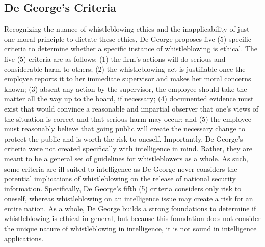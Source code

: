 \documentclass [12 pt] {article}
\begin{document}
\subsection{De George's Criteria}
Recognizing the nuance of whistleblowing ethics and the inapplicability of just one moral principle to dictate these ethics, De George proposes five (5) specific criteria to determine whether a specific instance of whistleblowing is ethical. The five (5) criteria are as follows: (1) the firm's actions will do serious and considerable harm to others; (2) the whistleblowing act is justifiable once the employee reports it to her immediate supervisor and makes her moral concerns known; (3) absent any action by the supervisor, the employee should take the matter all the way up to the board, if necessary; (4) documented evidence must exist that would convince a reasonable and impartial observer that one's views of the situation is correct and that serious harm may occur; and (5) the employee must reasonably believe that going public will create the necessary change to protect the public and is worth the risk to oneself.
\bigbreak
Importantly, De George's criteria were not created specifically with intelligence in mind. Rather, they are meant to be a general set of guidelines for whistleblowers as a whole. As such, some criteria are ill-suited to intelligence as De George never considers the potential implications of whistleblowing on the release of national security information. Specifically, De George's fifth (5) criteria considers only risk to oneself, whereas whistleblowing on an intelligence issue may create a risk for an entire nation. As a whole, De George builds a strong foundations to determine if whistleblowing is ethical in general, but because this foundation does not consider the unique nature of whistleblowing in intelligence, it is not sound in intelligence applications.
\end{document}
